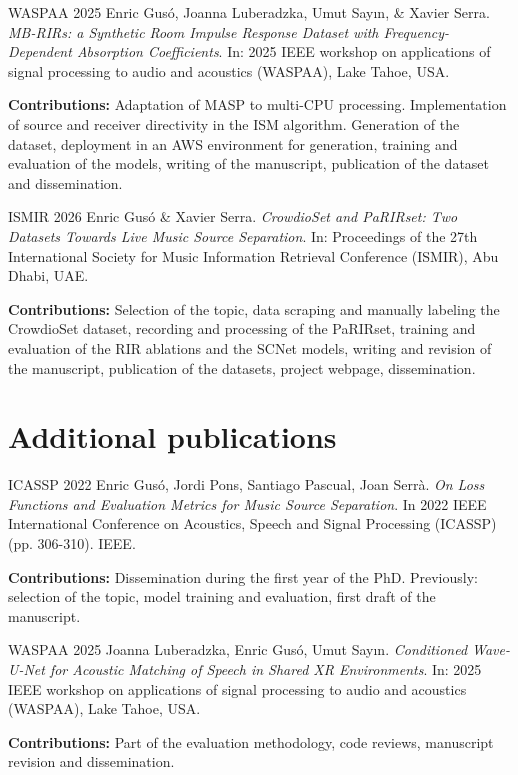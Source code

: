 \begin{mybox}{WASPAA 2025}
    Enric Gusó, Joanna Luberadzka, Umut Say\i n, \& Xavier Serra.
    \emph{MB-RIRs: a Synthetic Room Impulse Response Dataset with Frequency-Dependent Absorption Coefficients}.
    In: 2025 IEEE workshop on applications of signal processing to audio and acoustics (WASPAA), Lake Tahoe, USA. 
\end{mybox}
\textbf{Contributions:} Adaptation of \acrshort{MASP} to multi-CPU processing. Implementation of source and receiver directivity in the \acrshort{ISM} algorithm. Generation of the dataset, deployment in an AWS environment for generation, training and evaluation of the models, writing of the manuscript, publication of the dataset and dissemination.

\begin{mybox}{ISMIR 2026}
    Enric Gusó \& Xavier Serra.
    \emph{CrowdioSet and PaRIRset: Two Datasets Towards Live Music Source Separation}.
    In: Proceedings of the 27th International Society for Music Information Retrieval Conference (ISMIR), Abu Dhabi, UAE. 
\end{mybox}
\textbf{Contributions:} Selection of the topic, data scraping and manually labeling the CrowdioSet dataset, recording and processing of the PaRIRset, training and evaluation of the \acrshort{RIR} ablations and the SCNet models, writing and revision of the manuscript, publication of the datasets, project webpage, dissemination.

\section{Additional publications}
\label{sec:pubs_co_author}

\begin{mybox}{ICASSP 2022}
    Enric Gusó, Jordi Pons, Santiago Pascual, Joan Serrà.
    \emph{On Loss Functions and Evaluation Metrics for Music Source Separation}.
    In 2022 IEEE International Conference on Acoustics, Speech and Signal Processing (ICASSP) (pp. 306-310). IEEE. 
\end{mybox}
\textbf{Contributions:} Dissemination during the first year of the PhD. Previously: selection of the topic, model training and evaluation, first draft of the manuscript.

\begin{mybox}{WASPAA 2025}
    Joanna Luberadzka, Enric Gusó, Umut Say\i n.
    \emph{Conditioned Wave-U-Net for Acoustic Matching of Speech in Shared XR Environments}.
    In: 2025 IEEE workshop on applications of signal processing to audio and acoustics (WASPAA), Lake Tahoe, USA. 
\end{mybox}
\textbf{Contributions:} Part of the evaluation methodology, code reviews, manuscript revision and dissemination.

